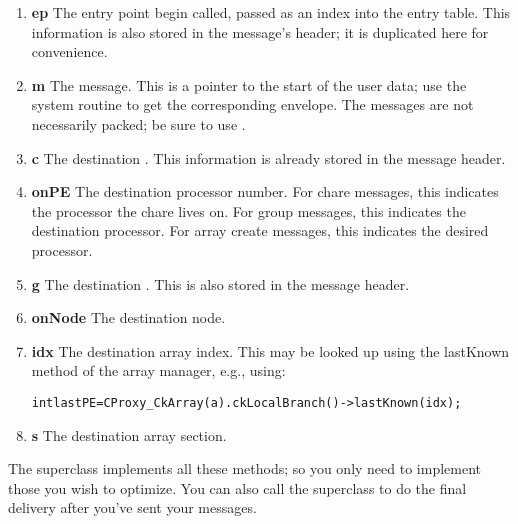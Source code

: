 \begin{enumerate}
\item{{\bf ep} The entry point begin called, passed as an index into the
\charmpp{} entry table.  This information is also stored in the message's
header; it is duplicated here for convenience.}
\item{{\bf m} The \charmpp{} message.  This is a pointer to the start of the
user data; use the system routine  to get the corresponding envelope.
The messages are not necessarily packed; be sure to use .}
\item{{\bf c} The destination .  This information is already
stored in the message header.}
\item{{\bf onPE} The destination processor number. For chare messages, this
indicates the processor the chare lives on.  For group messages, this indicates
the destination processor.  For array create messages, this indicates the 
desired processor.}
\item{{\bf g} The destination .  This is also stored in the 
message header.}
\item{{\bf onNode} The destination node.}
\item{{\bf idx} The destination array index.  This may be looked up using
the lastKnown method of the array manager, e.g., using:
  \begin{alltt}
  int lastPE=CProxy_CkArray(a).ckLocalBranch()->lastKnown(idx);
  \end{alltt} }
\item{{\bf s} The destination array section.}
\end{enumerate}


The  superclass implements all these methods; so
you only need to implement those you wish to optimize.  You can
also call the superclass to do the final delivery after you've
sent your messages.



